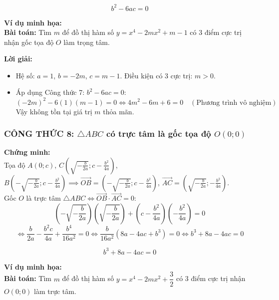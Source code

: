 \begin{itemize}
\begin{tcolorbox}[title=CÔNG THỨC GIẢI NHANH 7]
\[
b^2 - 6ac = 0
\]
\end{tcolorbox}

\noindent \textbf{Ví dụ minh họa:} \\
\textbf{Bài toán:} Tìm $m$ để đồ thị hàm số $y = x^4 - 2mx^2 + m - 1$ có 3 điểm cực trị nhận gốc tọa độ $O$ làm trọng tâm.

\noindent \textbf{Lời giải:}
\begin{itemize}
    \item Hệ số: $a = 1$, $b = -2m$, $c = m - 1$. Điều kiện có 3 cực trị: $m > 0$.
    \item Áp dụng Công thức 7: $b^2 - 6ac = 0$:
    \[
    (-2m)^2 - 6(1)(m - 1) = 0 \iff 4m^2 - 6m + 6 = 0 \quad (\text{Phương trình vô nghiệm})
    \]
    Vậy không tồn tại giá trị $m$ thỏa mãn.
\end{itemize}

\vspace{0.5cm}

\subsubsection{CÔNG THỨC 8: $\triangle ABC$ có trực tâm là gốc tọa độ $O(0;0)$}

\noindent \textbf{Chứng minh:} \\
Tọa độ $A(0; c)$, $C\left(\sqrt{-\frac{b}{2a}}; c - \frac{b^2}{4a}\right)$, $B\left(-\sqrt{-\frac{b}{2a}}; c - \frac{b^2}{4a}\right) \implies \vec{OB} = \left(-\sqrt{-\frac{b}{2a}}; c - \frac{b^2}{4a}\right)$, $\vec{AC} = \left(\sqrt{-\frac{b}{2a}}; -\frac{b^2}{4a}\right)$. \\
Gốc $O$ là trực tâm $\triangle ABC \iff \vec{OB} \cdot \vec{AC} = 0$:
\[
\left(-\sqrt{-\frac{b}{2a}}\right)\left(\sqrt{-\frac{b}{2a}}\right) + \left(c - \frac{b^2}{4a}\right)\left(-\frac{b^2}{4a}\right) = 0
\]
\[
\iff \frac{b}{2a} - \frac{b^2 c}{4a} + \frac{b^4}{16a^2} = 0 \iff \frac{b}{16a^2} \left(8a - 4ac + b^3\right) = 0 \iff b^3 + 8a - 4ac = 0
\]

\begin{tcolorbox}[title=CÔNG THỨC GIẢI NHANH 8]
\[
b^3 + 8a - 4ac = 0
\]
\end{tcolorbox}

\noindent \textbf{Ví dụ minh họa:} \\
\textbf{Bài toán:} Tìm $m$ để đồ thị hàm số $y = x^4 - 2mx^2 + \dfrac{3}{2}$ có 3 điểm cực trị nhận $O(0;0)$ làm trực tâm.


\end{itemize}

